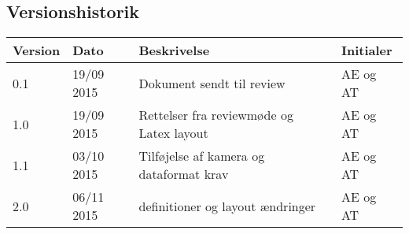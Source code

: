 \subsection{Versionshistorik}

\begin{center}
		\begin{longtable}{ | m{1.5cm}| m{2cm}| m{7cm}| m{2cm}| } 
			\hline
			\textbf{Version} & \textbf{Dato}  & \textbf{Beskrivelse} & \textbf{Initialer}  \\ 
			\hline
			0.1 &  19/09 2015  & Dokument sendt til review & AE og AT \\
			\hline
			1.0  &  19/09 2015 & Rettelser fra reviewmøde og Latex layout & AE og AT \\
			\hline
			1.1  &  03/10 2015 &  Tilføjelse af kamera og dataformat krav & AE og AT \\
			\hline
			2.0  &  06/11 2015  & definitioner og layout ændringer & AE og AT \\
			\hline
		\end{longtable}
		
	\end{center}
	\pagebreak
